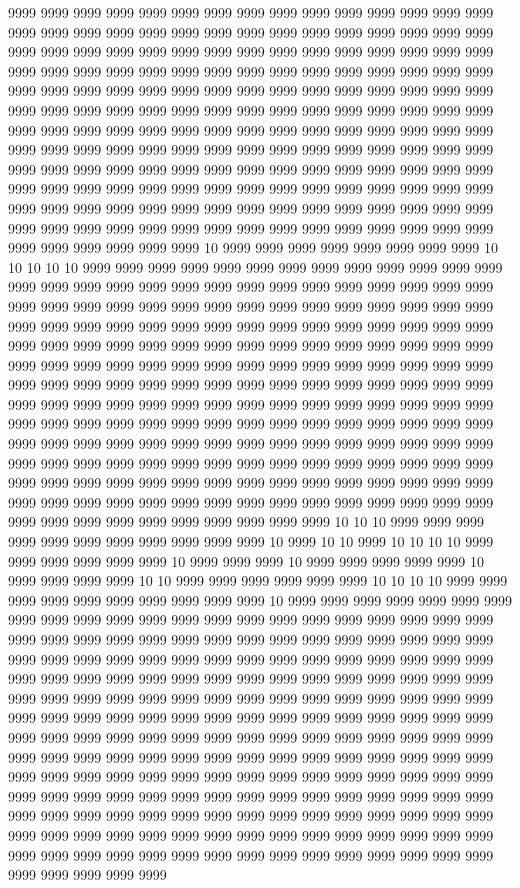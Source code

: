 9999 9999 9999 9999 9999 9999 9999 9999 9999 9999 9999 9999 9999 9999 9999 9999 9999 9999 9999 9999 9999 9999 9999 9999 9999 9999 9999 9999 9999 9999 9999 9999 9999 9999 9999 9999 9999 9999 9999 9999 9999 9999 9999 9999 9999 9999 9999 9999 9999 9999 9999 9999 9999 9999 9999 9999 9999 9999 9999 9999 9999 9999 9999 9999 9999 9999 9999 9999 9999 9999 9999 9999 9999 9999 9999 9999 9999 9999 9999 9999 9999 9999 9999 9999 9999 9999 9999 9999 9999 9999 9999 9999 9999 9999 9999 9999 9999 9999 9999 9999 9999 9999 9999 9999 9999 9999 9999 9999 9999 9999 9999 9999 9999 9999 9999 9999 9999 9999 9999 9999 9999 9999 9999 9999 9999 9999 9999 9999 9999 9999 9999 9999 9999 9999 9999 9999 9999 9999 9999 9999 9999 9999 9999 9999 9999 9999 9999 9999 9999 9999 9999 9999 9999 9999 9999 9999 9999 9999 9999 9999 9999 9999 9999 9999 9999 9999 9999 9999 9999 9999 9999 9999 9999 9999 9999 9999 9999 9999 9999 9999 9999 9999 9999 9999 9999 9999 10 9999 9999 9999 9999 9999 9999 9999 9999 10 10 10 10 10 9999 9999 9999 9999 9999 9999 9999 9999 9999 9999 9999 9999 9999 9999 9999 9999 9999 9999 9999 9999 9999 9999 9999 9999 9999 9999 9999 9999 9999 9999 9999 9999 9999 9999 9999 9999 9999 9999 9999 9999 9999 9999 9999 9999 9999 9999 9999 9999 9999 9999 9999 9999 9999 9999 9999 9999 9999 9999 9999 9999 9999 9999 9999 9999 9999 9999 9999 9999 9999 9999 9999 9999 9999 9999 9999 9999 9999 9999 9999 9999 9999 9999 9999 9999 9999 9999 9999 9999 9999 9999 9999 9999 9999 9999 9999 9999 9999 9999 9999 9999 9999 9999 9999 9999 9999 9999 9999 9999 9999 9999 9999 9999 9999 9999 9999 9999 9999 9999 9999 9999 9999 9999 9999 9999 9999 9999 9999 9999 9999 9999 9999 9999 9999 9999 9999 9999 9999 9999 9999 9999 9999 9999 9999 9999 9999 9999 9999 9999 9999 9999 9999 9999 9999 9999 9999 9999 9999 9999 9999 9999 9999 9999 9999 9999 9999 9999 9999 9999 9999 9999 9999 9999 9999 9999 9999 9999 9999 9999 9999 9999 9999 9999 9999 9999 9999 9999 9999 9999 9999 9999 9999 9999 9999 9999 9999 9999 9999 9999 9999 9999 9999 9999 9999 10 10 10 9999 9999 9999 9999 9999 9999 9999 9999 9999 9999 9999 10 9999 10 10 9999 10 10 10 10 9999 9999 9999 9999 9999 9999 10 9999 9999 9999 10 9999 9999 9999 9999 9999 10 9999 9999 9999 9999 10 10 9999 9999 9999 9999 9999 9999 10 10 10 10 9999 9999 9999 9999 9999 9999 9999 9999 9999 9999 10 9999 9999 9999 9999 9999 9999 9999 9999 9999 9999 9999 9999 9999 9999 9999 9999 9999 9999 9999 9999 9999 9999 9999 9999 9999 9999 9999 9999 9999 9999 9999 9999 9999 9999 9999 9999 9999 9999 9999 9999 9999 9999 9999 9999 9999 9999 9999 9999 9999 9999 9999 9999 9999 9999 9999 9999 9999 9999 9999 9999 9999 9999 9999 9999 9999 9999 9999 9999 9999 9999 9999 9999 9999 9999 9999 9999 9999 9999 9999 9999 9999 9999 9999 9999 9999 9999 9999 9999 9999 9999 9999 9999 9999 9999 9999 9999 9999 9999 9999 9999 9999 9999 9999 9999 9999 9999 9999 9999 9999 9999 9999 9999 9999 9999 9999 9999 9999 9999 9999 9999 9999 9999 9999 9999 9999 9999 9999 9999 9999 9999 9999 9999 9999 9999 9999 9999 9999 9999 9999 9999 9999 9999 9999 9999 9999 9999 9999 9999 9999 9999 9999 9999 9999 9999 9999 9999 9999 9999 9999 9999 9999 9999 9999 9999 9999 9999 9999 9999 9999 9999 9999 9999 9999 9999 9999 9999 9999 9999 9999 9999 9999 9999 9999 9999 9999 9999 9999 9999 9999 9999 9999 9999 9999 9999 9999 9999 9999 9999 9999 9999 9999 9999 9999 9999 9999 9999 9999 